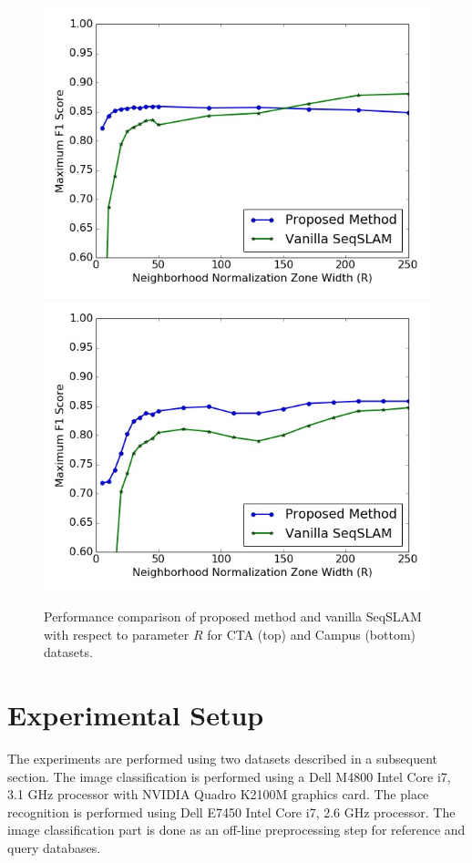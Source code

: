 \documentclass[letterpaper, 10 pt, conference]{ieeeconf}  %
\begin{document}
\begin{figure}
\centering
 \includegraphics[scale=0.3]{RPerformance1} \\
 \includegraphics[scale=0.3]{RPerformance2}
 \caption{Performance comparison of proposed method and vanilla SeqSLAM with respect to parameter $R$ for CTA (top) and Campus (bottom) datasets.}
 \label{fig:RPerformance}
\end{figure}


\section{Experimental Setup}
The experiments are performed using two datasets described in a subsequent section. The image classification is performed using a Dell M4800 Intel Core i7, 3.1 GHz processor with NVIDIA Quadro K2100M graphics card. The place recognition is performed using Dell E7450 Intel Core i7, 2.6 GHz processor. The image classification part is done as an off-line preprocessing step for reference and query databases.
\end{document}

